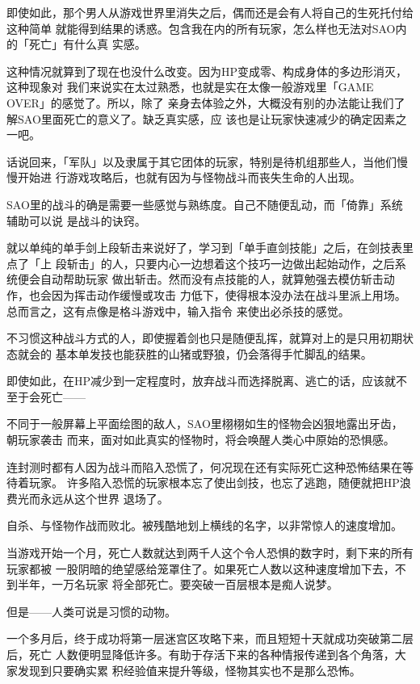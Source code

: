 \documentclass[11pt]{book}
\begin{document}
即使如此，那个男人从游戏世界里消失之后，偶而还是会有人将自己的生死托付给这种简单
就能得到结果的诱惑。包含我在内的所有玩家，怎么样也无法对SAO内的「死亡」有什么真
实感。

这种情况就算到了现在也没什么改变。因为HP变成零、构成身体的多边形消灭，这种现象对
我们来说实在太过熟悉，也就是实在太像一般游戏里「GAME OVER」的感觉了。所以，除了
亲身去体验之外，大概没有别的办法能让我们了解SAO里面死亡的意义了。缺乏真实感，应
该也是让玩家快速减少的确定因素之一吧。

话说回来，「军队」以及隶属于其它团体的玩家，特别是待机组那些人，当他们慢慢开始进
行游戏攻略后，也就有因为与怪物战斗而丧失生命的人出现。

SAO里的战斗的确是需要一些感觉与熟练度。自己不随便乱动，而「倚靠」系统辅助可以说
是战斗的诀窍。

就以单纯的单手剑上段斩击来说好了，学习到「单手直剑技能」之后，在剑技表里点了「上
段斩击」的人，只要内心一边想着这个技巧一边做出起始动作，之后系统便会自动帮助玩家
做出斩击。然而没有点技能的人，就算勉强去模仿斩击动作，也会因为挥击动作缓慢或攻击
力低下，使得根本没办法在战斗里派上用场。总而言之，这有点像是格斗游戏中，输入指令
来使出必杀技的感觉。

不习惯这种战斗方式的人，即使握着剑也只是随便乱挥，就算对上的是只用初期状态就会的
基本单发技也能获胜的山猪或野狼，仍会落得手忙脚乱的结果。

即使如此，在HP减少到一定程度时，放弃战斗而选择脱离、逃亡的话，应该就不至于会死亡——

不同于一般屏幕上平面绘图的敌人，SAO里栩栩如生的怪物会凶狠地露出牙齿，朝玩家袭击
而来，面对如此真实的怪物时，将会唤醒人类心中原始的恐惧感。

连封测时都有人因为战斗而陷入恐慌了，何况现在还有实际死亡这种恐怖结果在等待着玩家。
许多陷入恐慌的玩家根本忘了使出剑技，也忘了逃跑，随便就把HP浪费光而永远从这个世界
退场了。

自杀、与怪物作战而败北。被残酷地划上横线的名字，以非常惊人的速度增加。

当游戏开始一个月，死亡人数就达到两千人这个令人恐惧的数字时，剩下来的所有玩家都被
一股阴暗的绝望感给笼罩住了。如果死亡人数以这种速度增加下去，不到半年，一万名玩家
将全部死亡。要突破一百层根本是痴人说梦。

但是——人类可说是习惯的动物。

一个多月后，终于成功将第一层迷宫区攻略下来，而且短短十天就成功突破第二层后，死亡
人数便明显降低许多。有助于存活下来的各种情报传递到各个角落，大家发现到只要确实累
积经验值来提升等级，怪物其实也不是那么恐怖。
\end{document}
